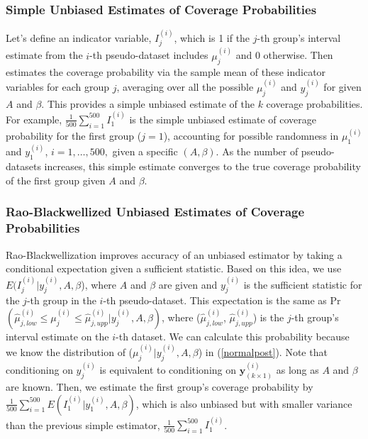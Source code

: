 \documentclass[article]{jss}
\begin{document}
\subsubsection{Simple Unbiased Estimates of Coverage Probabilities}
Let's define an indicator variable, $I^{(i)}_{j}$, which is 1 if the $j$-th group's interval estimate from the $i$-th pseudo-dataset includes $\mu^{(i)}_{j}$ and 0 otherwise. Then  estimates the coverage probability via the sample mean of these indicator variables for each group $j$, averaging over all the possible $\mu^{(i)}_{j}$ and $y^{(i)}_{j}$ for given $A$ and $\beta$. This provides a simple unbiased estimate of the $k$ coverage probabilities. For example, $\frac{1}{500}\sum_{i=1}^{500}I^{(i)}_{1}$ is the simple unbiased estimate of coverage probability for the first group ($j=1$), accounting for possible randomness in $\mu^{(i)}_{1}$ and $y^{(i)}_{1}$, $i=1, \ldots, 500,$ given a specific $(A, \beta)$. As the number of pseudo-datasets increases, this simple estimate converges to the true coverage probability of the first group given $A$ and $\beta$.

\subsubsection{Rao-Blackwellized Unbiased Estimates of Coverage Probabilities}
Rao-Blackwellization improves accuracy of an unbiased estimator by taking a conditional expectation given a sufficient statistic. Based on this idea, we use $E(I^{(i)}_{j}\vert y^{(i)}_{j}, A, \beta$), where $A$ and $\beta$ are given and $y^{(i)}_{j}$ is the sufficient statistic for the $j$-th group in the $i$-th pseudo-dataset. This expectation is the same as Pr$(\hat{\mu}^{(i)}_{j, low}\le \mu^{(i)}_{j} \le\hat{\mu}^{(i)}_{j, upp}\vert y^{(i)}_{j}, A, \beta)$, where ($\hat{\mu}^{(i)}_{j, low}$, $\hat{\mu}^{(i)}_{j, upp}$) is the $j$-th group's interval estimate on the $i$-th dataset. We can calculate this probability  because we know the distribution of ($\mu^{(i)}_{j} \vert y^{(i)}_{j}, A, \beta$) in (\ref{normalpost}). Note that conditioning on $y^{(i)}_{j}$ is equivalent to conditioning on $\mathbf{y}^{(i)}_{(k\times1)}$ as long as $A$ and $\beta$ are known. Then, we estimate the first group's coverage probability by $\frac{1}{500}\sum_{i=1}^{500}E(I^{(i)}_{1}\vert y^{(i)}_{1}, A, \beta)$, which is also unbiased but with smaller variance than the previous simple estimator, $\frac{1}{500}\sum_{i=1}^{500}I^{(i)}_{1}$.
\end{document}
